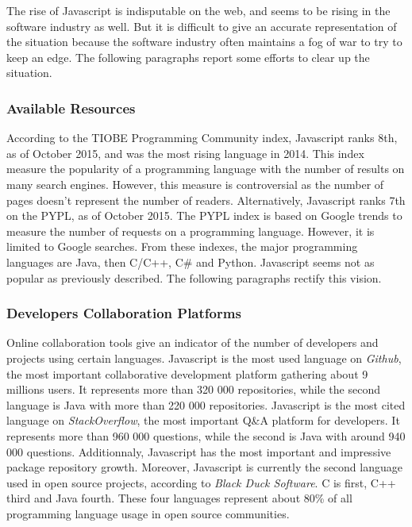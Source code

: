 The rise of Javascript is indisputable on the web, and seems to be rising in the software industry as well.
But it is difficult to give an accurate representation of the situation because the software industry often maintains a fog of war to try to keep an edge.
The following paragraphs report some efforts to clear up the situation.


\subsubsection{Available Resources}

According to the TIOBE Programming Community index, Javascript ranks 8th, as of October 2015, and was the most rising language in 2014.
This index measure the popularity of a programming language with the number of results on many search engines.
However, this measure is controversial as the number of pages doesn't represent the number of readers.
Alternatively, Javascript ranks 7th on the PYPL, as of October 2015.
The PYPL index is based on Google trends to measure the number of requests on a programming language.
However, it is limited to Google searches.
From these indexes, the major programming languages are Java, then C/C++, C\# and Python.
Javascript seems not as popular as previously described.
The following paragraphs rectify this vision.


\subsubsection{Developers Collaboration Platforms}

Online collaboration tools give an indicator of the number of developers and projects using certain languages.
Javascript is the most used language on \textit{Github}, the most important collaborative development platform gathering about 9 millions users.
It represents more than 320 000 repositories, while the second language is Java with more than 220 000 repositories.
Javascript is the most cited language on \textit{StackOverflow}, the most important Q\&A platform for developers.
It represents more than 960 000 questions, while the second is Java with around 940 000 questions.
Additionnaly, Javascript has the most important and impressive package repository growth.
Moreover, Javascript is currently the second language used in open source projects, according to \textit{Black Duck Software}.
C is first, C++ third and Java fourth.
These four languages represent about 80\% of all programming language usage in open source communities.

